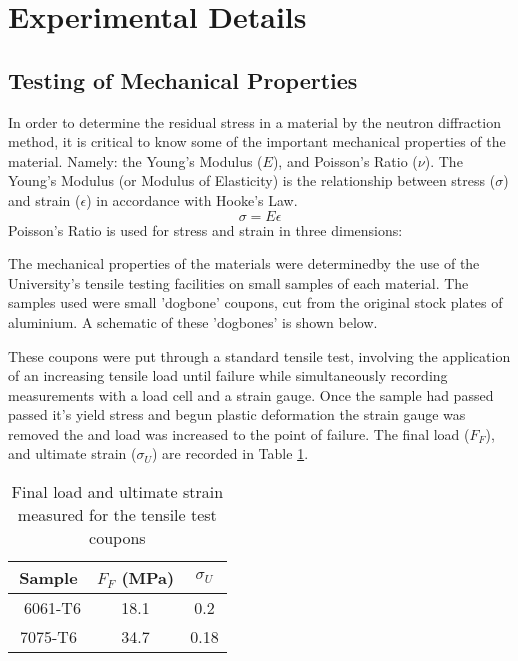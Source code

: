 \documentclass[11pt, oneside]{article}   	%
\begin{document}
\section{Experimental Details}
\subsection{Testing of Mechanical Properties}
In order to determine the residual stress in a material by the neutron diffraction method, it is critical to know some of the important mechanical properties of the material. Namely: the Young's Modulus ($E$), and Poisson's Ratio ($\nu$). The Young's Modulus (or Modulus of Elasticity) is the relationship between stress ($\sigma$) and strain ($\epsilon$) in accordance with Hooke's Law.
$$\sigma = E\epsilon$$
Poisson's Ratio is used for stress and strain in three dimensions:

The mechanical properties of the materials were determinedby the use of the University's tensile testing facilities on small samples of each material. The samples used were small 'dogbone' coupons, cut from the original stock plates of aluminium. A schematic of these 'dogbones' is shown below.

These coupons were put through a standard tensile test, involving the application of an increasing tensile load until failure while simultaneously recording measurements with a load cell and a strain gauge. Once the sample had passed passed it's yield stress and begun plastic deformation the strain gauge was removed the and load was increased to the point of failure. The final load ($F_F$), and ultimate strain ($\sigma_U$) are recorded in Table \ref{tab:a}.
\begin{table}[h]
	\centering
	\caption{Final load and ultimate strain measured for the tensile test coupons}\label{tab:a}
	\begin{tabular}[c]{c | c c}
	Sample & $F_F$ (\si{\mega\pascal}) & $\sigma_U$ \\ \hline\
	6061-T6 & 18.1 & 0.2 \\
	7075-T6 & 34.7 & 0.18 \\
	\end{tabular}
\end{table}
\end{document}

